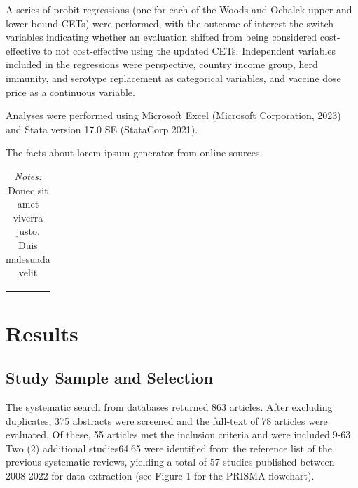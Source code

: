 \documentclass[12pt]{article}
\begin{document}
A series of probit regressions (one for each of the Woods and Ochalek upper and lower-bound CETs) were performed, with the outcome of interest the switch variables indicating whether an evaluation shifted from being considered cost-effective to not cost-effective using the updated CETs. Independent variables included in the regressions were perspective, country income group, herd immunity, and serotype replacement as categorical variables, and vaccine dose price as a continuous variable.

Analyses were performed using Microsoft Excel (Microsoft Corporation, 2023) and Stata version 17.0 SE (StataCorp 2021). 


\hspace{1em}

\begin{table}[H]
    \centering 
    \caption{The facts about lorem ipsum generator from online sources.}
    \begin{tabular}{|C{2cm}|L{10cm}|C{2.5cm}|}
        \hline
    \end{tabular}
    \label{MyTable1}
    \caption*{\footnotesize \textit{Notes:} Donec sit amet viverra justo. Duis malesuada velit}
\end{table}


\section{Results}
\subsection{Study Sample and Selection}
The systematic search from databases returned 863 articles. After excluding duplicates, 375 abstracts were screened and the full-text of 78 articles were evaluated. Of these, 55 articles met the inclusion criteria and were included.9-63 Two (2) additional studies64,65 were identified from the reference list of the previous systematic reviews, yielding a total of 57 studies published between 2008-2022 for data extraction (see  Figure 1 for the PRISMA flowchart). 
\end{document}
